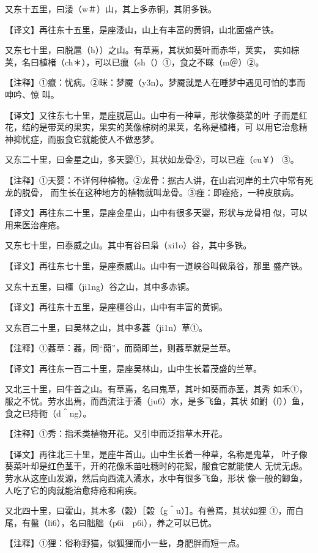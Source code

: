 \documentclass[a4paper,12pt,UTF8,twoside]{ctexbook}
\begin{document}
又东十五里，曰涹（w＃）山，其上多赤铜，其阴多铁。

【译文】再往东十五里，是座涹山，山上有丰富的黄铜，山北面盛产铁。

又东七十里，曰脱扈（h））之山。有草焉，其状如葵叶而赤华，荚实， 实如棕荚，名曰植楮（ch＊），可以已癙（sh（）①，食之不眯（m＠）②。

【注释】①癙：忧病。②眯：梦魇（y3n）。梦魇就是人在睡梦中遇见可怕的事而呻吟、惊 叫。

【译文】又往东七十里，是座脱扈山。山中有一种草，形状像葵菜的叶 子而是红花，结的是带荚的果实，果实的荚像棕树的果荚，名称是植楮，可 以用它治愈精神抑忧症，而服食它就能使人不做恶梦。

又东二十里，曰金星之山，多天婴①，其状如龙骨②，可以已痤（cu￥） ③。

【注释】①天婴：不详何种植物。②龙骨：据古人讲，在山岩河岸的土穴中常有死龙的脱骨， 而生长在这种地方的植物就叫龙骨。③痤：即痤疮，一种皮肤病。

【译文】再往东二十里，是座金星山，山中有很多天婴，形状与龙骨相 似，可以用来医治痤疮。

又东七十里，曰泰威之山。其中有谷曰枭（xi1o）谷，其中多铁。

【译文】再往东七十里，是座泰威山。山中有一道峡谷叫做枭谷，那里 盛产铁。

又东十五里，曰橿（ji1ng）谷之山，其中多赤铜。

【译文】再往东十五里，是座橿谷山，山中有丰富的黄铜。

又东百二十里，曰吴林之山，其中多葌（ji1n）草①。

【注释】①葌草：葌，同“蕑”，而蕑即兰，则葌草就是兰草。

【译文】再往东一百二十里，是座吴林山，山中生长着茂盛的兰草。

又北三十里，曰牛首之山。有草焉，名曰鬼草，其叶如葵而赤茎，其秀 如禾①，服之不忧。劳水出焉，而西流注于潏（ju6）水，是多飞鱼，其状 如鲋（f））鱼，食之已痔衕（d＾ng）。

【注释】①秀：指禾类植物开花。又引申而泛指草木开花。

【译文】再往北三十里，是座牛首山。山中生长着一种草，名称是鬼草， 叶子像葵菜叶却是红色茎干，开的花像禾苗吐穗时的花絮，服食它就能使人 无忧无虑。劳水从这座山发源，然后向西流入潏水，水中有很多飞鱼，形状 像一般的鲫鱼，人吃了它的肉就能治愈痔疮和痢疾。

又北四十里，曰霍山，其木多（穀）［榖（g＾u）］。有兽焉，其状如狸 ①，而白尾，有鬣（li6），名曰胐胐（p6i　p6i），养之可以已忧。

【注释】①狸：俗称野猫，似狐狸而小一些，身肥胖而短一点。
\end{document}
